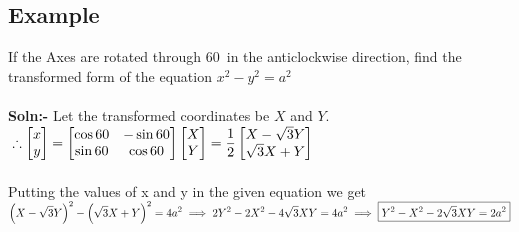 \documentclass[14pt]{article}
\begin{document}
	\subsection{Example}
	\large{
		If the Axes are rotated through 60\textdegree \, in the anticlockwise direction, find the transformed form of the equation $x^2-y^2=a^2$
	}
	\\ \\ \large{
		\textbf{Soln:-} Let the transformed coordinates be $X$ and $Y$.
		$\\ \\ \displaystyle \therefore \begin{bmatrix}
		x \\ y
		\end{bmatrix}=\begin{bmatrix}
			\cos60 & -\sin60\\
			\sin60 & \cos60
		\end{bmatrix}
		\begin{bmatrix}
		X \\ Y
		\end{bmatrix}
		=\frac{1}{2}\begin{bmatrix}
		X-\sqrt{3}Y \\ \sqrt{3}X+Y
		\end{bmatrix}$
		\\ \\ Putting the values of x and y in the given equation we get
		\\ $\displaystyle \left(X-\sqrt{3}Y\right)^2-\left(\sqrt{3}X+Y\right)^2=4a^2
		\\ \\ \implies 2Y^2-2X^2-4\sqrt{3}XY=4a^2 \implies \boxed{Y^2-X^2-2\sqrt{3}XY=2a^2}$
	}
\end{document}
